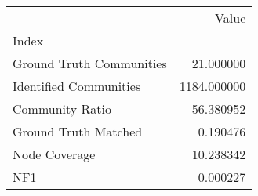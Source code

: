 \begin{tabular}{lr}
\toprule
{} &        Value \\
Index                    &              \\
\midrule
Ground Truth Communities &    21.000000 \\
Identified Communities   &  1184.000000 \\
Community Ratio          &    56.380952 \\
Ground Truth Matched     &     0.190476 \\
Node Coverage            &    10.238342 \\
NF1                      &     0.000227 \\
\bottomrule
\end{tabular}
